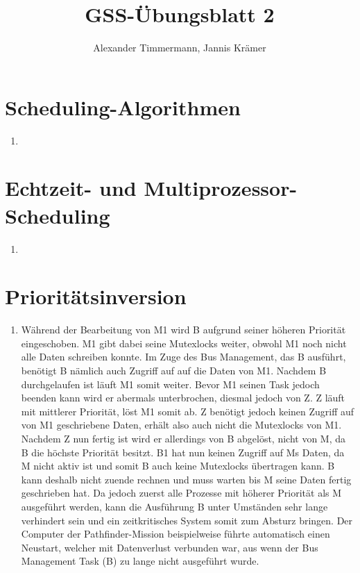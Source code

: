 \documentclass[a4paper,11pt]{scrartcl}
\author{Alexander Timmermann, Jannis Krämer}
\title{GSS-Übungsblatt 2}
\date{}
\begin{document}
\maketitle
\thispagestyle{empty}

\doublespace

\section{Scheduling-Algorithmen}

\begin{enumerate}[\bf a)]
    \item
\end{enumerate}

\section{Echtzeit- und Multiprozessor-Scheduling}

\begin{enumerate}[\bf a)]
    \item
\end{enumerate}

\section{Prioritätsinversion}

\begin{enumerate}[\bf a)]
    \item Während der Bearbeitung von M1 wird B aufgrund seiner höheren Priorität eingeschoben. M1 gibt dabei seine Mutexlocks weiter, obwohl M1 noch nicht alle Daten schreiben konnte. Im Zuge des Bus Management, das B ausführt, benötigt B nämlich auch Zugriff auf auf die Daten von M1. Nachdem B durchgelaufen ist läuft M1 somit weiter. Bevor M1 seinen Task jedoch beenden kann wird er abermals unterbrochen, diesmal jedoch von Z. Z läuft mit mittlerer Priorität, löst M1 somit ab. Z benötigt jedoch keinen Zugriff auf von M1 geschriebene Daten, erhält also auch nicht die Mutexlocks von M1. Nachdem Z nun fertig ist wird er allerdings von B abgelöst, nicht von M, da B die höchste Priorität besitzt. B1 hat nun keinen Zugriff auf Ms Daten, da M nicht aktiv ist und somit B auch keine Mutexlocks übertragen kann. B kann deshalb nicht zuende rechnen und muss warten bis M seine Daten fertig geschrieben hat. Da jedoch zuerst alle Prozesse mit höherer Priorität als M ausgeführt werden, kann die Ausführung B unter Umständen sehr lange verhindert sein und ein zeitkritisches System somit zum Absturz bringen. Der Computer der Pathfinder-Mission beispielweise führte automatisch einen Neustart, welcher mit Datenverlust verbunden war, aus wenn der Bus Management Task (B) zu lange nicht ausgeführt wurde. 
\end{enumerate}
\end{document}
